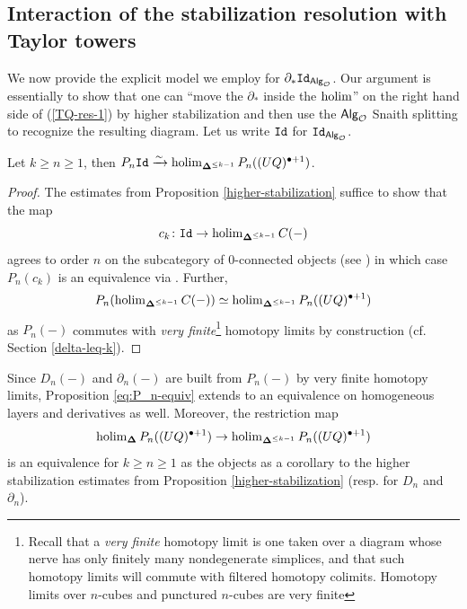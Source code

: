 \subsection{Interaction of the stabilization resolution with Taylor towers} \label{sec:fibrant-model}
We now provide the explicit model we employ for $\partial_* \mathtt{Id}_{{\mathsf{Alg}_{\mathcal{O}}}}$. Our argument is essentially to show that one can ``move the $\partial_*$ inside the $\operatorname{holim}$'' on the right hand side of (\ref{TQ-res-1}) by higher stabilization and then use the ${\mathsf{Alg}_{\mathcal{O}}}$ Snaith splitting to recognize the resulting diagram. Let us write $\mathtt{Id}$ for $\mathtt{Id}_{{\mathsf{Alg}_{\mathcal{O}}}}$.

\begin{proposition} \label{eq:P_n-equiv}
Let $k\geq n\geq 1$, then $P_n \mathtt{Id} \xrightarrow{\sim} \operatorname{holim}_{\mathbf{\Delta}^{\leq k-1}} P_n ((UQ)^{\bullet+1})$.
\end{proposition} 

\begin{proof} 
The estimates from Proposition \ref{higher-stabilization} suffice to show that  the map \[c_k\colon \mathtt{Id}\to \operatorname{holim}_{\mathbf{\Delta}^{\leq k-1}} C(-)\] agrees to order $n$ on the subcategory of $0$-connected objects (see \cite[1.2]{Goo-Calc3}) in which case $P_n (c_k)$ is an equivalence via \cite[1.6]{Goo-Calc3}. Further, \[P_n (\operatorname{holim}_{\mathbf{\Delta}^{\leq k-1}} C(-)) \simeq \operatorname{holim}_{\mathbf{\Delta}^{\leq k-1}} P_n  ((UQ)^{\bullet+1})\] as $P_n(-)$ commutes with \textit{very finite}\footnote{
    Recall that a \textit{very finite} homotopy limit is one taken over a diagram whose nerve has only finitely many nondegenerate simplices, and that such homotopy limits will commute with filtered homotopy colimits. Homotopy limits over $n$-cubes and punctured $n$-cubes are very finite
} homotopy limits by construction (cf. Section \ref{delta-leq-k}).  
\end{proof} 

Since $D_n(-)$ and $\partial_n(-)$ are built from $P_n(-)$ by very finite homotopy limits, Proposition \ref{eq:P_n-equiv} extends to an equivalence on homogeneous layers and derivatives as well. Moreover, the restriction map \[\operatorname{holim}_{\mathbf{\Delta}} P_n((UQ)^{\bullet+1})\to \operatorname{holim}_{\mathbf{\Delta}^{\leq k-1}} P_n ((UQ)^{\bullet+1})\] 
is an equivalence for $k\geq n\geq1$ as the objects as a corollary to the higher stabilization estimates from Proposition \ref{higher-stabilization} (resp. for $D_n$ and $\partial_n$). 

